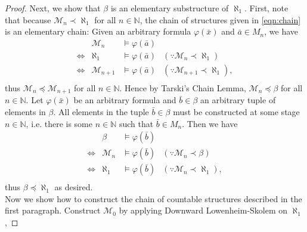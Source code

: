 \documentclass{article}
\begin{document}
\begin{enumerate}[label={\bf Q\arabic*:}]
\begin{enumerate}[label={\bf(\arabic*)}]
\begin{proof}
          Next, we show that $\beta$ is an elementary
          substructure of $\aleph_1$. First, note that because
          $\mathcal{M}_n\prec\aleph_1$ for all $n\in\mathbb{N}$, the chain
          of structures given in \eqref{eqn:chain} is an elementary chain:
          Given an arbitrary formula $\varphi(\bar{x})$ and
          $\bar{a}\in M_n$, we have
          \[\begin{array}{crll}
            &\mathcal{M}_n &\models\varphi(\bar{a}) & \\
            \Leftrightarrow &\aleph_1 &\models\varphi(\bar{a})
              &(\because\mathcal{M}_n\prec\aleph_1) \\
            \Leftrightarrow &\mathcal{M}_{n+1} &\models\varphi(\bar{a})
              &(\because\mathcal{M}_{n+1}\prec\aleph_1), \\
          \end{array}\]
          thus $\mathcal{M}_n\preceq\mathcal{M}_{n+1}$ for all
          $n\in\mathbb{N}$. Hence by Tarski's Chain Lemma,
          $\mathcal{M}_n\preceq\beta$ for all $n\in\mathbb{N}$.
          Let $\varphi(\bar{x})$ be an arbitrary formula and
          $\bar{b}\in\beta$ an arbitrary tuple of elements in $\beta$.
          All elements in the tuple $\bar{b}\in\beta$ must be constructed
          at some stage $n\in\mathbb{N}$, i.e. there is some
          $n\in\mathbb{N}$ such that $\bar{b}\in M_n$. Then we have
          \[\begin{array}{crll}
            &\beta &\models\varphi(\bar{b}) & \\
            \Leftrightarrow &\mathcal{M}_n &\models\varphi(\bar{b})
              &(\because\mathcal{M}_n\prec\beta) \\
            \Leftrightarrow &\aleph_1 &\models\varphi(\bar{b})
              &(\because\mathcal{M}_{n}\prec\aleph_1), \\
          \end{array}\]
          thus $\beta\preceq\aleph_1$ as desired. \\

          Now we show how to construct the chain of countable structures
          described in the first paragraph. Construct $\mathcal{M}_0$ by
          applying Downward Lowenheim-Skolem on $\aleph_1$,
        \end{proof}
    \end{enumerate}
\end{enumerate}
\end{document}
